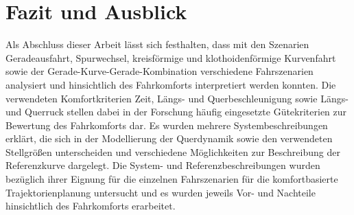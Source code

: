\chapter{Fazit und Ausblick}\label{cha:Fazit}
Als Abschluss dieser Arbeit lässt sich festhalten, dass mit den Szenarien Geradeausfahrt, Spurwechsel, kreisförmige und klothoidenförmige Kurvenfahrt sowie der Gerade-Kurve-Gerade-Kombination verschiedene Fahrszenarien analysiert und hinsichtlich des Fahrkomforts interpretiert werden konnten. Die verwendeten Komfortkriterien Zeit, Längs- und Querbeschleunigung sowie Längs- und Querruck stellen dabei in der Forschung häufig eingesetzte Gütekriterien zur Bewertung des Fahrkomforts dar. Es wurden mehrere Systembeschreibungen erklärt, die sich in der Modellierung der Querdynamik sowie den verwendeten Stellgrößen unterscheiden und verschiedene Möglichkeiten zur Beschreibung der Referenzkurve dargelegt. Die System- und Referenzbeschreibungen wurden bezüglich ihrer Eignung für die einzelnen Fahrszenarien für die komfortbasierte Trajektorienplanung untersucht und es wurden jeweils Vor- und Nachteile hinsichtlich des Fahrkomforts erarbeitet. 